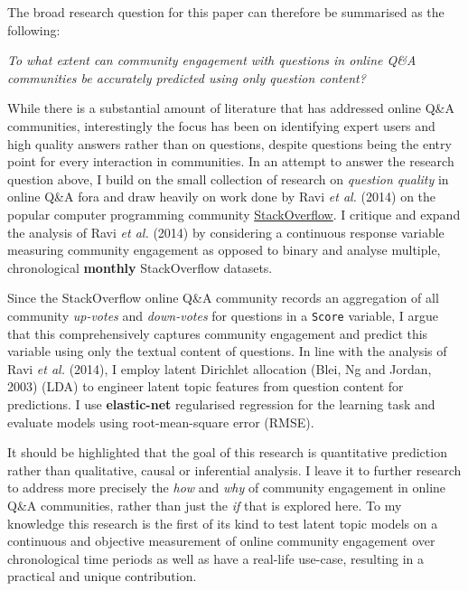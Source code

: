 \documentclass[11pt,preprint, authoryear]{article}
\numberwithin{equation}{section}
\begin{document}
The broad research question for this paper can therefore be summarised
as the following:

\begin{center}
\emph{To what extent can community engagement with questions in online Q\&A communities be accurately predicted using only question content?}
\end{center}

While there is a substantial amount of literature that has addressed
online Q\&A communities, interestingly the focus has been on identifying
expert users and high quality answers rather than on questions, despite
questions being the entry point for every interaction in communities. In
an attempt to answer the research question above, I build on the small
collection of research on \emph{question quality} in online Q\&A fora
and draw heavily on work done by Ravi \emph{et al.} (2014) on the
popular computer programming community
\href{https://StackOverflow.com}{StackOverflow}. I critique and expand
the analysis of Ravi \emph{et al.} (2014) by considering a continuous
response variable measuring community engagement as opposed to binary
and analyse multiple, chronological \textbf{monthly} StackOverflow
datasets.

Since the StackOverflow online Q\&A community records an aggregation of
all community \emph{up-votes} and \emph{down-votes} for questions in a
\texttt{Score} variable, I argue that this comprehensively captures
community engagement and predict this variable using only the textual
content of questions. In line with the analysis of Ravi \emph{et al.}
(2014), I employ latent Dirichlet allocation (Blei, Ng and Jordan, 2003)
(LDA) to engineer latent topic features from question content for
predictions. I use \textbf{elastic-net} regularised regression for the
learning task and evaluate models using root-mean-square error (RMSE).

It should be highlighted that the goal of this research is quantitative
prediction rather than qualitative, causal or inferential analysis. I
leave it to further research to address more precisely the \emph{how}
and \emph{why} of community engagement in online Q\&A communities,
rather than just the \emph{if} that is explored here. To my knowledge
this research is the first of its kind to test latent topic models on a
continuous and objective measurement of online community engagement over
chronological time periods as well as have a real-life use-case,
resulting in a practical and unique contribution.
\end{document}
